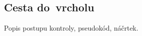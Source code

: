 \subsection{Cesta do~vrcholu}\label{subsec:cesta_do_vrcholu}

Popis postupu kontroly, pseudokód, náčrtek.

%
%
%
%

